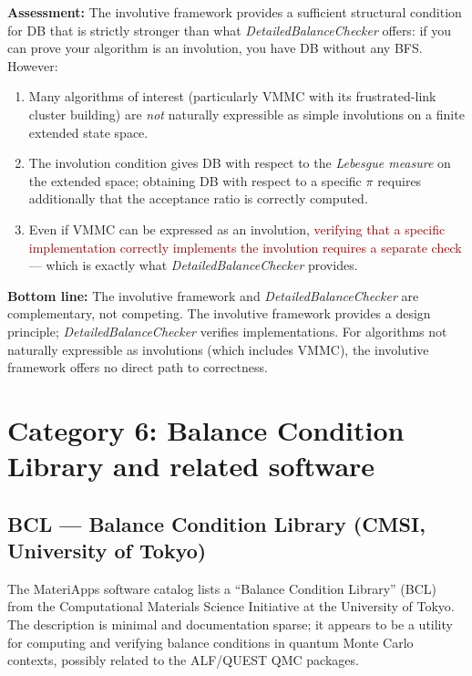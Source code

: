 \documentclass[11pt,a4paper]{article}
\newcommand{\bad}[1]{\textcolor{darkred}{#1}}
\newcommand{\DBC}{\textit{DetailedBalanceChecker}}
\begin{document}
\textbf{Assessment:}  The involutive framework provides a sufficient structural
condition for DB that is strictly stronger than what \DBC{} offers: if you can
prove your algorithm is an involution, you have DB without any BFS.  However:
\begin{enumerate}[nosep]
  \item Many algorithms of interest (particularly VMMC with its frustrated-link
    cluster building) are \emph{not} naturally expressible as simple involutions on
    a finite extended state space.
  \item The involution condition gives DB with respect to the \emph{Lebesgue
    measure} on the extended space; obtaining DB with respect to a specific $\pi$
    requires additionally that the acceptance ratio is correctly computed.
  \item Even if VMMC can be expressed as an involution, \bad{verifying that a
    specific implementation correctly implements the involution requires a separate
    check} — which is exactly what \DBC{} provides.
\end{enumerate}

\textbf{Bottom line:}  The involutive framework and \DBC{} are complementary, not
competing.  The involutive framework provides a design principle; \DBC{} verifies
implementations.  For algorithms not naturally expressible as involutions (which
includes VMMC), the involutive framework offers no direct path to correctness.

\section{Category 6: Balance Condition Library and related software}
\label{sec:software}

\subsection{BCL — Balance Condition Library (CMSI, University of Tokyo)}

The MateriApps software catalog lists a ``Balance Condition Library'' (BCL) from
the Computational Materials Science Initiative at the University of Tokyo.  The
description is minimal and documentation sparse; it appears to be a utility for
computing and verifying balance conditions in quantum Monte Carlo contexts,
possibly related to the ALF/QUEST QMC packages.
\end{document}
